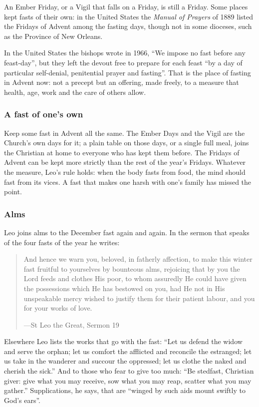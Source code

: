 An Ember Friday, or a Vigil that falls on a Friday, is still a Friday. Some
places kept fasts of their own: in the United States the \textit{Manual of
Prayers} of 1889 listed the Fridays of Advent among the fasting days, though
not in some dioceses, such as the Province of New Orleans.

In the United States the bishops wrote in 1966, ``We impose no fast before any
feast-day'', but they left the devout free to prepare for each feast ``by a day
of particular self-denial, penitential prayer and fasting''. That is the place
of fasting in Advent now: not a precept but an offering, made freely, to a
measure that health, age, work and the care of others allow.

\subsubsection*{A fast of one's own}

Keep some fast in Advent all the same. The Ember Days and the Vigil are the
Church's own days for it; a plain
table on those days, or a single full meal, joins the Christian at home to
everyone who has kept them before. The Fridays of Advent can be kept more
strictly than the rest of the year's Fridays. Whatever the measure, Leo's rule
holds: when the body fasts from food, the mind should fast from its vices. A
fast that makes one harsh with one's family has missed the point.

\subsubsection*{Alms}

Leo joins alms to the December fast again and again. In the sermon that speaks of the four fasts of the year he writes:

\begin{quote}
And hence we warn you, beloved, in fatherly affection, to make this winter fast
fruitful to yourselves by bounteous alms, rejoicing that by you the Lord feeds
and clothes His poor, to whom assuredly He could have given the possessions
which He has bestowed on you, had He not in His unspeakable mercy wished to
justify them for their patient labour, and you for your works of love.\par
{\smallskip\noindent\small ---St Leo the Great, Sermon 19\par}
\end{quote}

Elsewhere Leo lists the works that go with the fast: ``Let us defend the widow and serve the
orphan; let us comfort the afflicted and reconcile the estranged; let us take
in the wanderer and succour the oppressed; let us clothe the naked and cherish
the sick.'' And to those who fear to give too much: ``Be stedfast, Christian
giver: give what you may receive, sow what you may reap, scatter what you may
gather.'' Supplications, he says, that are ``winged by such aids mount swiftly
to God's ears''.

